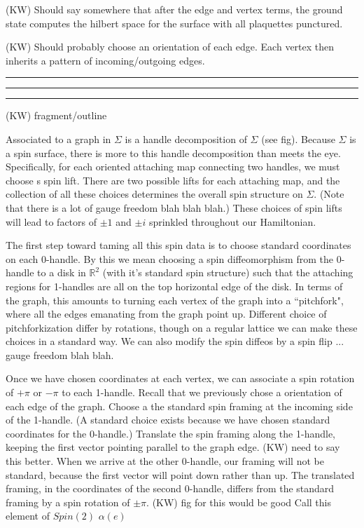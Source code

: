 \documentclass[12pt,a4paper]{article}
\newcommand{\rr}{\mathbb{R}}
\newcommand{\kw}[1]{{\color{kwcolor}\footnotesize{(KW) #1}}}
\newcommand{\kwsep}{\bigskip\hrule\medskip\hrule\medskip\hrule\bigskip}
\begin{document}
\kw{Should say somewhere that after the edge and vertex terms, the ground state computes the hilbert space
for the surface with all plaquettes punctured.}

\kw{Should probably choose an orientation of each edge.
Each vertex then inherits a pattern of incoming/outgoing edges.}




\kwsep

\kw{fragment/outline}

Associated to a graph in $\Sigma$ is a handle decomposition of $\Sigma$ (see fig).
Because $\Sigma$ is a spin surface, there is more to this handle decomposition than meets the eye.
Specifically, for each oriented attaching map connecting two handles, we must choose s spin lift.
There are two possible lifts for each attaching map, and the collection of all these choices determines
the overall spin structure on $\Sigma$.
(Note that there is a lot of gauge freedom blah blah blah.)
These choices of spin lifts will lead to factors of $\pm 1$ and $\pm i$ sprinkled throughout our Hamiltonian.

The first step toward taming all this spin data is to choose standard coordinates on each 0-handle.
By this we mean choosing a spin diffeomorphism from the 0-handle to a disk in $\rr^2$ (with it's standard
spin structure)
such that the attaching regions for 1-handles are all on the top horizontal edge of the disk.
In terms of the graph, this amounts to turning each vertex of the graph into a ``pitchfork",
where all the edges emanating from the graph point up.
Different choice of pitchforkization differ by rotations, though on a regular lattice
we can make these choices in a standard way.
We can also modify the spin diffeos by a spin flip ... gauge freedom blah blah.

Once we have chosen coordinates at each vertex, we can associate a spin rotation of $+\pi$ or
$-\pi$ to each 1-handle.
Recall that we previously chose a orientation of each edge of the graph.
Choose a the standard spin framing at the incoming side of the 1-handle.
(A standard choice exists because we have chosen standard coordinates for the 0-handle.)
Translate the spin framing along the 1-handle, keeping the first vector pointing parallel to the graph edge.
\kw{need to say this better}.
When we arrive at the other 0-handle, our framing will not be standard, because the first vector will point
down rather than up.
The translated framing, in the coordinates of the second 0-handle, differs from the standard framing by a spin rotation
of $\pm\pi$.
\kw{fig for this would be good}
Call this element of $Spin(2)$ $\alpha(e)$
\end{document}
